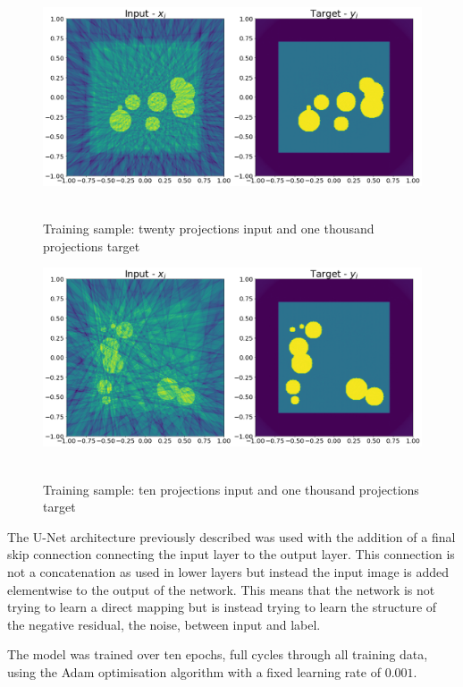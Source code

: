 \begin{figure}[htb]
\centering
     \includegraphics[width=\textwidth]{figures/trainingsamples2} \
  \caption{Training sample: twenty projections input and one thousand projections target}
  \label{trainingsamples2}
\end{figure}

\begin{figure}[htb]
\centering
     \includegraphics[width=\textwidth]{figures/trainingsamples3} \
  \caption{Training sample: ten projections input and one thousand projections target}
  \label{trainingsamples3}
\end{figure}

The U-Net architecture previously described was used with the addition of a final skip connection connecting the input layer to the output layer. This connection is not a concatenation as used in 
lower layers but instead the input image is added elementwise to the output of the network. This means that the network is not trying to learn a direct mapping but is instead trying to learn the structure 
of the negative residual, the noise, between input and label. 

The model was trained over ten epochs, full cycles through all training data, using the Adam optimisation algorithm with a fixed learning rate of $0.001$.

